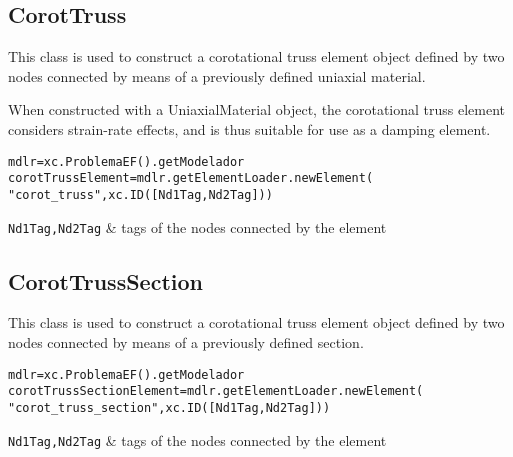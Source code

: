 \subsection{CorotTruss}
This class is used to construct a corotational truss element object defined by two nodes connected by means of a previously defined uniaxial material.

When constructed with a UniaxialMaterial object, the corotational truss element considers strain-rate effects, and is thus suitable for use as a damping element.
\begin{verbatim}
mdlr=xc.ProblemaEF().getModelador
corotTrussElement=mdlr.getElementLoader.newElement(
"corot_truss",xc.ID([Nd1Tag,Nd2Tag]))
\end{verbatim}
\begin{paramFuncTable}
{\tt Nd1Tag,Nd2Tag} & tags of the nodes connected by the element\\
\end{paramFuncTable}

\begin{paramClassTable}
\ElementParam{}
\ElementONEDParam{}
\CorotTrussParam{}
\end{paramClassTable}

\begin{methodsTable}
\ElementMeth{}
\ElementONEDMeth{}
\ProtoTrussMeth{}
\CorotTrussMeth{}
\end{methodsTable}

\subsection{CorotTrussSection}
This class is used to construct a corotational truss element object defined by two nodes connected by means of a previously defined section.

\begin{verbatim}
mdlr=xc.ProblemaEF().getModelador
corotTrussSectionElement=mdlr.getElementLoader.newElement(
"corot_truss_section",xc.ID([Nd1Tag,Nd2Tag]))
\end{verbatim}
\begin{paramFuncTable}
{\tt Nd1Tag,Nd2Tag} & tags of the nodes connected by the element\\
\end{paramFuncTable}

\begin{paramClassTable}
\ElementParam{}
\ElementONEDParam{}
\end{paramClassTable}

\begin{methodsTable}
\ElementMeth{}
\ElementONEDMeth{}
\ProtoTrussMeth{}
\end{methodsTable}
